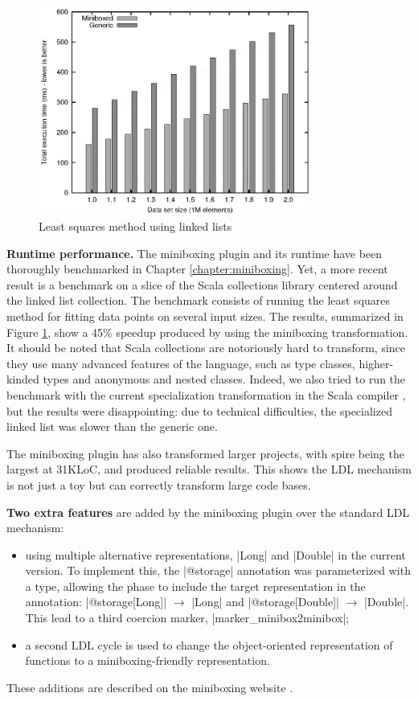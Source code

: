 \begin{figure}[t!]
\centering
\includegraphics[width=0.80\textwidth]{graph.eps}
\caption{Least squares method using linked lists}
\label{ldl:fig:linkedlist}

\end{figure}

\textbf{Runtime performance.} The miniboxing plugin and its runtime have been thoroughly benchmarked in Chapter \ref{chapter:miniboxing}. Yet, a more recent result is a benchmark on a slice of the Scala collections library \cite{miniboxing-linkedlist} centered around the linked list collection. The benchmark consists of running the least squares method for fitting data points on several input sizes. The results, summarized in Figure \ref{ldl:fig:linkedlist}, show a 45\% speedup produced by using the miniboxing transformation. It should be noted that Scala collections are notoriously hard to transform, since they use many advanced features of the language, such as type classes, higher-kinded types and anonymous and nested classes. Indeed, we also tried to run the benchmark with the current specialization transformation in the Scala compiler \cite{iuli-thesis}, but the results were disappointing: due to technical difficulties, the specialized linked list was slower than the generic one.

The miniboxing plugin has also transformed larger projects, with spire \cite{erik-spire} being the largest at 31KLoC, and produced reliable results. This shows the LDL mechanism is not just a toy but can correctly transform large code bases.

\textbf{Two extra features} are added by the miniboxing plugin over the standard LDL mechanism:
\begin{itemize}
\item using multiple alternative representations, |Long| and |Double| in the current version. To implement this, the |@storage| annotation was parameterized with a type, allowing the \inject{} phase to include the target representation in the annotation: |@storage[Long]| $\rightarrow$ |Long| and |@storage[Double]| $\rightarrow$ |Double|. This lead to a third coercion marker, |marker_minibox2minibox|;
\item a second LDL cycle is used to change the object-oriented representation of functions to a miniboxing-friendly representation.
\end{itemize}
These additions are described on the miniboxing website \cite{miniboxing-www}.

